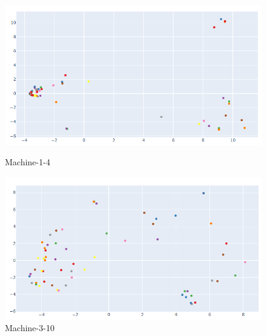 \begin{figure}[]
	\centering
	\begin{minipage}[b]{0.45\textwidth}
		\includegraphics[width=\textwidth]{images/model_centrality_good2-8_2}
		\caption{Machine-1-4}
		\label{model-centrality-plot-good}
	\end{minipage}
	\begin{minipage}[b]{0.45\textwidth}
		\includegraphics[width=\textwidth]{images/model_centrality_bad3-10_2}
		\caption{Machine-3-10}
		\label{model-centrality-plot-bad}
	\end{minipage}
\end{figure}

